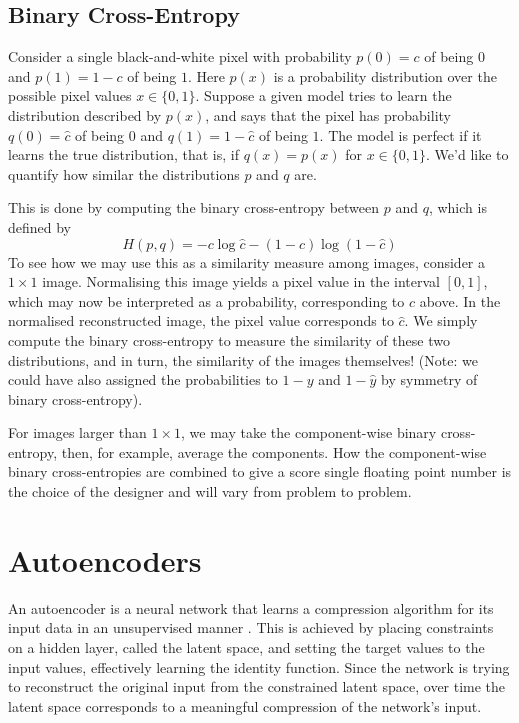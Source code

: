 \subsection{Binary Cross-Entropy}
Consider a single black-and-white pixel with probability $p(0) = c$ of being $0$ and $p(1) = 1 - c$ of being $1$. Here $p(x)$ is a probability distribution over the possible pixel values $x \in \{0, 1\}$. Suppose a given model tries to learn the distribution described by $p(x)$, and says that the pixel has probability $q(0) = \hat{c}$ of being $0$ and $q(1) = 1 - \hat{c}$ of being $1$. The model is perfect if it learns the true distribution, that is, if $q(x) = p(x)$ for $x\in\{0,1\}$. We'd like to quantify how similar the distributions $p$ and $q$ are.

This is done by computing the binary cross-entropy between $p$ and $q$, which is defined by $$H(p,q) = -c\log\hat{c} - (1-c)\log(1-\hat{c})$$ To see how we may use this as a similarity measure among images, consider a $1\times1$ image. Normalising this image yields a pixel value in the interval $[0, 1]$, which may now be interpreted as a probability, corresponding to $c$ above. In the normalised reconstructed image, the pixel value corresponds to $\hat{c}$. We simply compute the binary cross-entropy to measure the similarity of these two distributions, and in turn, the similarity of the images themselves! (Note: we could have also assigned the probabilities to $1-y$ and $1-\hat{y}$ by symmetry of binary cross-entropy).

For images larger than $1 \times 1$, we may take the component-wise binary cross-entropy, then, for example, average the components. How the component-wise binary cross-entropies are combined to give a score single floating point number is the choice of the designer and will vary from problem to problem.

\section{Autoencoders}

An autoencoder is a neural network that learns a compression algorithm for its input data in an unsupervised manner \cite{Liou2008}. This is achieved by placing constraints on a hidden layer, called the latent space, and setting the target values to the input values, effectively learning the identity function. Since the network is trying to reconstruct the original input from the constrained latent space, over time the latent space corresponds to a meaningful compression of the network's input.

